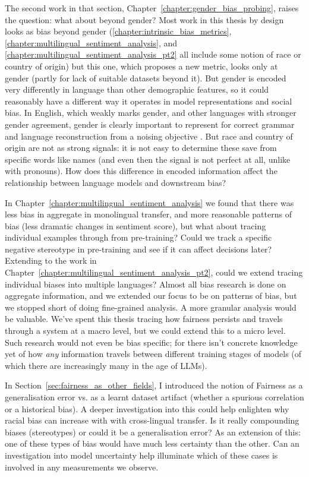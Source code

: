 The second work in that section, Chapter~\ref{chapter:gender_bias_probing}, raises the question: what about beyond gender? Most work in this thesis by design looks as bias beyond gender (\ref{chapter:intrinsic_bias_metrics}, \ref{chapter:multilingual_sentiment_analysis}, and \ref{chapter:multilingual_sentiment_analysis_pt2} all include some notion of race or country of origin) but this one,  which proposes a new metric, looks only at gender (partly for lack of suitable datasets beyond it). But gender is encoded very differently in language than other demographic features, so it could reasonably have a different way it operates in model representations and social bias. In English, which weakly marks gender, and other languages with stronger gender agreement, gender is clearly important to represent for correct grammar and language reconstruction from a noising objective \citep{}. But race and country of origin are not as strong signals: it is not easy to determine these save from specific words like names (and even then the signal is not perfect at all, unlike with pronouns). How does this difference in encoded information affect the relationship between language models and downstream bias?

In Chapter~\ref{chapter:multilingual_sentiment_analysis} we found that there was less bias in aggregate in monolingual transfer, and more reasonable patterns of bias (less dramatic changes in sentiment score), but what about tracing individual examples through from pre-training? Could we track a specific negative stereotype in pre-training and see if it can affect decisions later? Extending to the work in Chapter~\ref{chapter:multilingual_sentiment_analysis_pt2}, could we extend tracing individual biases into multiple languages? Almost all bias research is done on aggregate information, and we extended our focus to be on patterns of bias, but we stopped short of doing fine-grained analysis. A more granular analysis would be valuable. We've spent this thesis tracing how fairness persists and travels through a system at a macro level, but we could extend this to a micro level. Such research would not even be bias specific; for there isn't concrete knowledge yet of how \textit{any} information travels between different training stages of models (of which there are increasingly many in the age of LLMs).

In Section~\ref{sec:fairness_as_other_fields}, I introduced the notion of Fairness as a generalisation error vs. as a learnt dataset artifact (whether a spurious correlation or a historical bias). A deeper investigation into this could help enlighten why racial bias can increase with with cross-lingual transfer. Is it really compounding biases (stereotypes) or could it be a generalisation error? As an extension of this: one of these types of bias would have much less certainty than the other. Can an investigation into model uncertainty help illuminate which of these cases is involved in any measurements we observe.

